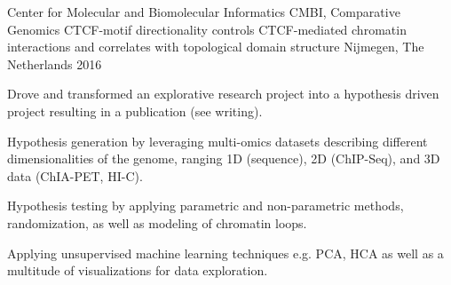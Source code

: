 \begin{cventries}
  \cventry
    { Center for Molecular and Biomolecular Informatics CMBI, Comparative Genomics } %
    { CTCF-motif directionality controls CTCF-mediated chromatin interactions and correlates with topological domain structure } %
    { Nijmegen, The Netherlands } %
    { 2016 } %
    { 
      \begin{cvitems} %
      \item { Drove and transformed an explorative research project into a hypothesis driven project resulting in a publication (see writing). }
      \item { Hypothesis generation by leveraging multi-omics datasets describing different dimensionalities of the genome, ranging 1D (sequence), 2D (ChIP-Seq), and 3D data (ChIA-PET, HI-C). }
      \item { Hypothesis testing by applying parametric and non-parametric methods, randomization, as well as modeling of chromatin loops. }
      \item { Applying unsupervised machine learning techniques e.g. PCA, HCA as well as a multitude of visualizations for data exploration. }
      
      \end{cvitems}
    }


\end{cventries}
\newpage